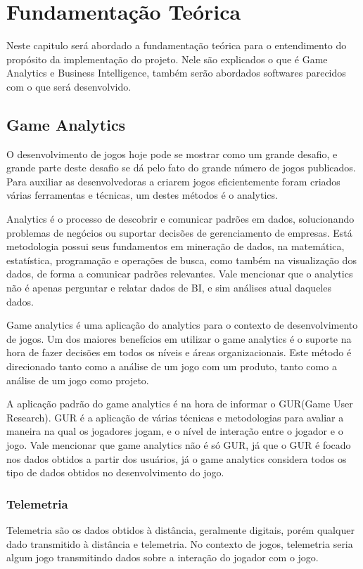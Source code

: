 \chapter[Fundamentação Teórica]{Fundamentação Teórica}
Neste capitulo será abordado a fundamentação teórica para o entendimento do propósito da implementação do projeto. Nele são explicados o que é Game Analytics e Business Intelligence, também serão abordados softwares parecidos com o que será desenvolvido.
\section{Game Analytics}
O desenvolvimento de jogos hoje pode se mostrar como um grande desafio, e grande parte deste desafio se dá pelo fato do grande número de jogos publicados. Para auxiliar as desenvolvedoras a criarem jogos eficientemente foram criados várias ferramentas e técnicas, um destes métodos é o analytics.

Analytics é o processo de descobrir e comunicar padrões em dados, solucionando problemas de negócios ou suportar decisões de gerenciamento de empresas. Está metodologia possui seus fundamentos em mineração de dados, na matemática, estatística, programação e operações de busca, como também na visualização dos dados, de forma a comunicar padrões relevantes. Vale mencionar que o analytics não é apenas perguntar e relatar dados de BI, e sim análises atual daqueles dados\cite{analytics}. 

Game analytics é uma aplicação do analytics para o contexto de desenvolvimento de jogos\cite{game_analytics}. Um dos maiores benefícios em utilizar o game analytics é o suporte na hora de fazer decisões em todos os níveis e áreas organizacionais. Este método é direcionado tanto como a análise de um jogo com um produto, tanto como a análise de um jogo como projeto.

A aplicação padrão do game analytics é na hora de informar o GUR(Game User Research). GUR é a aplicação de várias técnicas e metodologias para avaliar a maneira na qual os jogadores jogam, e o nível de interação entre o jogador e o jogo. Vale mencionar que game analytics não é só GUR, já que o GUR é focado nos dados obtidos a partir dos usuários, já o game analytics considera todos os tipo de dados obtidos no desenvolvimento do jogo.
\subsection{Telemetria}
Telemetria são os dados obtidos à distância, geralmente digitais, porém qualquer dado transmitido à distância e telemetria. No contexto de jogos, telemetria seria algum jogo transmitindo dados sobre a interação do jogador com o jogo.

